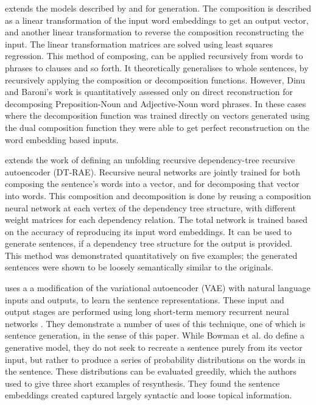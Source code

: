 {%
\textcite{Dinu2014CompositionalGeneration}  extends the models described by \textcite{zanzotto2010estimating} and \textcite{Guevara2010} for generation. The composition is described as a linear transformation of the input word embeddings to get an output vector, and another linear transformation to reverse the composition reconstructing the input. The linear transformation matrices are solved using least squares regression. This method of composing, can be applied recursively from words to phrases to clauses and so forth.
It theoretically generalises to whole sentences, by recursively applying the composition or decomposition functions. However, Dinu and Baroni's work is quantitatively assessed only on direct reconstruction for decomposing Preposition-Noun and Adjective-Noun word phrases. In these cases where the decomposition function was trained directly on vectors generated using the dual composition function they were able to get perfect reconstruction on the word embedding based inputs.


\textcite{iyyer2014generating} extends the work of \textcite{SocherEtAl2011:PoolRAE} defining an unfolding recursive dependency-tree recursive autoencoder (DT-RAE). Recursive neural networks are jointly trained for both composing the sentence's words into a vector, and for decomposing that vector into words. This composition and decomposition is done by reusing a composition neural network at each vertex of the  dependency tree structure, with different weight matrices for each dependency relation. The total network is trained based on the accuracy of reproducing its input word embeddings. It can be used to generate sentences, if a dependency tree structure for the output is provided. This method was demonstrated quantitatively on five examples; the generated sentences were shown to be loosely semantically similar to the originals.


\textcite{Bowman2015SmoothGeneration} uses a a modification of the variational autoencoder (VAE) \parencite{2014VAE} with natural language inputs and outputs, to learn the sentence representations. These input and output stages are performed using long short-term memory recurrent neural networks \parencite{hochreiter1997long}. They demonstrate a number of uses of this technique, one of which is sentence generation, in the sense of this paper.
While Bowman et al. do define a generative model, they do not seek to recreate a sentence purely from its vector input, but rather to produce a series of probability distributions on the words in the sentence. These distributions can be evaluated greedily, which the authors used to give three short examples of resynthesis. They found the sentence embeddings created captured largely syntactic and loose topical information. 

}
